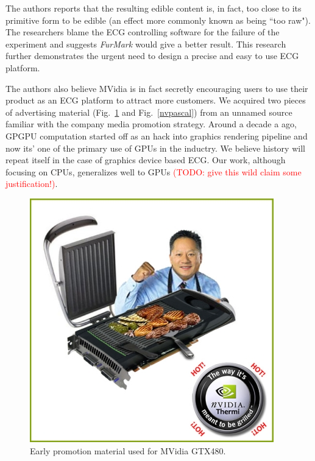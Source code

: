 \documentclass[conference]{IEEEtran}
\begin{document}
The authors reports that the resulting edible content is, in fact, too close to its primitive form to be edible (an effect more commonly known as being ``too raw"). The researchers blame the ECG controlling software for the failure of the experiment and suggests \textit{FurMark} would give a better result. This research further demonstrates the urgent need to design a precise and easy to use ECG platform.

The authors also believe MVidia is in fact secretly encouraging users to use their product as an ECG platform to attract more customers. We acquired two pieces of advertising material (Fig.~\ref{nvfermi} and Fig.~\ref{nvpascal}) from an unnamed source familiar with the company media promotion strategy. Around a decade a ago, GPGPU computation started off as an hack into graphics rendering pipeline and now its' one of the primary use of GPUs in the inductry. We believe history will repeat itself in the case of graphics device based ECG. Our work, although focusing on CPUs, generalizes well to GPUs \textcolor{red}{(TODO: give this wild claim some justification!)}.

\begin{figure}[htbp]
\centerline{\includegraphics[width=\linewidth]{fig/nvfermi.jpg}}
\caption{Early promotion material used for MVidia GTX480.}
\label{nvfermi}
\end{figure}
\end{document}
